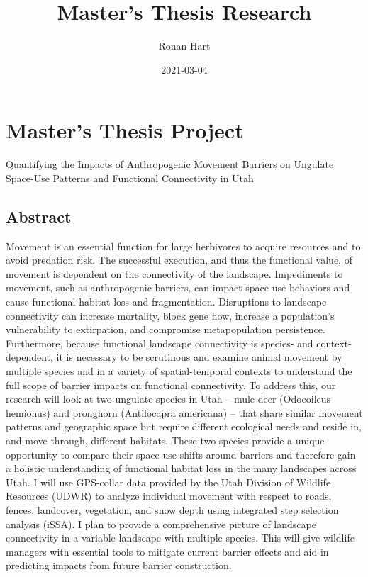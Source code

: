 \documentclass[
]{book}
\title{Master's Thesis Research}
\author{Ronan Hart}
\date{2021-03-04}
\begin{document}
\maketitle

{
\setcounter{tocdepth}{1}
\tableofcontents
}
\hypertarget{masters-thesis-project}{%
\chapter{Master's Thesis Project}\label{masters-thesis-project}}

Quantifying the Impacts of Anthropogenic Movement Barriers on Ungulate Space-Use Patterns and Functional Connectivity in Utah

\hypertarget{abstract}{%
\section{Abstract}\label{abstract}}

Movement is an essential function for large herbivores to acquire resources and to avoid predation risk. The successful execution, and thus the functional value, of movement is dependent on the connectivity of the landscape. Impediments to movement, such as anthropogenic barriers, can impact space-use behaviors and cause functional habitat loss and fragmentation. Disruptions to landscape connectivity can increase mortality, block gene flow, increase a population's vulnerability to extirpation, and compromise metapopulation persistence. Furthermore, because functional landscape connectivity is species- and context-dependent, it is necessary to be scrutinous and examine animal movement by multiple species and in a variety of spatial-temporal contexts to understand the full scope of barrier impacts on functional connectivity. To address this, our research will look at two ungulate species in Utah -- mule deer (Odocoileus hemionus) and pronghorn (Antilocapra americana) -- that share similar movement patterns and geographic space but require different ecological needs and reside in, and move through, different habitats. These two species provide a unique opportunity to compare their space-use shifts around barriers and therefore gain a holistic understanding of functional habitat loss in the many landscapes across Utah. I will use GPS-collar data provided by the Utah Division of Wildlife Resources (UDWR) to analyze individual movement with respect to roads, fences, landcover, vegetation, and snow depth using integrated step selection analysis (iSSA). I plan to provide a comprehensive picture of landscape connectivity in a variable landscape with multiple species. This will give wildlife managers with essential tools to mitigate current barrier effects and aid in predicting impacts from future barrier construction.
\end{document}
